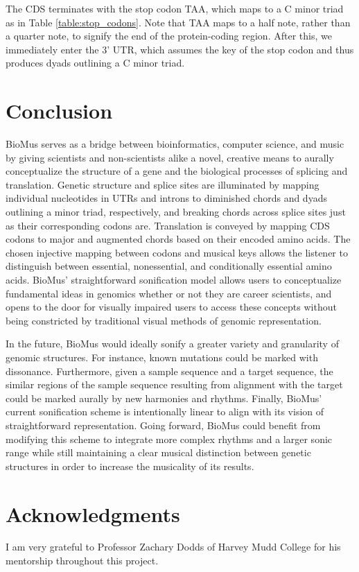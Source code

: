 \documentclass[letterpaper]{article}
\begin{document}
The CDS terminates with the stop codon TAA, which maps to a C minor triad as in Table \ref{table:stop_codons}. Note that TAA maps to a half note, rather than a quarter note, to signify the end of the protein-coding region. After this, we immediately enter the 3’ UTR, which assumes the key of the stop codon and thus produces dyads outlining a C minor triad.

\section{Conclusion}
BioMus serves as a bridge between bioinformatics, computer science, and music by giving scientists and non-scientists alike a novel, creative means to aurally conceptualize the structure of a gene and the biological processes of splicing and translation. Genetic structure and splice sites are illuminated by mapping individual nucleotides in UTRs and introns to diminished chords and dyads outlining a minor triad, respectively, and breaking chords across splice sites just as their corresponding codons are. Translation is conveyed by mapping CDS codons to major and augmented chords based on their encoded amino acids. The chosen injective mapping between codons and musical keys allows the listener to distinguish between essential, nonessential, and conditionally essential amino acids. BioMus’ straightforward sonification model allows users to conceptualize fundamental ideas in genomics whether or not they are career scientists, and opens to the door for visually impaired users to access these concepts without being constricted by traditional visual methods of genomic representation.

In the future, BioMus would ideally sonify a greater variety and granularity of genomic structures. For instance, known mutations could be marked with dissonance. Furthermore, given a sample sequence and a target sequence, the similar regions of the sample sequence resulting from alignment with the target could be marked aurally by new harmonies and rhythms. Finally, BioMus’ current sonification scheme is intentionally linear to align with its vision of straightforward representation. Going forward, BioMus could benefit from modifying this scheme to integrate more complex rhythms and a larger sonic range while still maintaining a clear musical distinction between genetic structures in order to increase the musicality of its results.


\section{Acknowledgments}

I am very grateful to Professor Zachary Dodds of Harvey Mudd College for his mentorship throughout this project.




\end{document}
